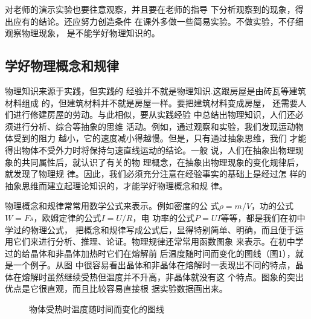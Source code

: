     对老师的演示实验也要往意观察，并且要在老师的指导
下分析观察到的现象，得出应有的结论。还应努力创造条件
在课外多做一些简易实验。不做实验，不仔细观察物理现象，
是不能学好物理知识的。

    \subsection*{学好物理概念和规律}

物理知识来源于实践，但实践的
经验并不就是物理知识.这跟房屋是由砖瓦等建筑材料组成
的，但建筑材料并不就是房屋一样。要把建筑材料变成房屋，
还需要人们进行修建房屋的劳动。与此相似，要从实践经验
中总结出物理知识，人们还必须进行分析、综合等抽象的思维
活动。例如，通过观察和实验，我们发现运动物体受到的阻力
越小，它的速度减小得越慢。但是，只有通过抽象思维，我们
才能得出物体不受外力时将保持匀速直线运动的结论。一般
说，人们在抽象出物理现象的共同属性后，就认识了有关的物
理概念，在抽象出物理现象的变化规律后，就发现了物理规
律。因此，我们必须充分注意在经验事实的基础上是经过怎
样的抽象思维而建立起理论知识的，才能学好物理概念和规
律。

物理概念和规律常常用数学公式来表示。例如密度的公
式$\rho=m/V$，功的公式$W=Fs$，欧姆定律的公式$I=U/R$，电
功率的公式$P=UI$等等，都是我们在初中学过的物理公式，
把概念和规律写成公式后，显得特别简单、明确，而且便于运
用它们来进行分析、推理、论证。物理规律还常常用函数图象
来表示。在初中学过的给晶体和非晶体加热时它们在熔解前
后温度随时间而变化的图线（图1），就是一个例子。从图
中很容易看出晶体和非晶体在熔解时一表现出不同的特点，晶
体在熔解时虽然继续受热但温度并不升高，非晶体就没有这
个特点。图象的突出优点是它很直观，而且比较容易直接根
据实验数据画出来。

\begin{figure}[htp]\centering 
{}\qquad\qquad 
{}
\caption{物体受热时温度随时间而变化的图线
}
\end{figure}

